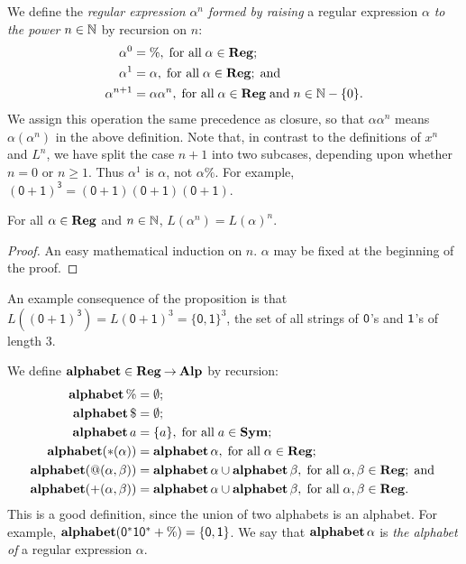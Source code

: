 We define the \emph{regular expression} $\alpha^n$ \emph{formed by
raising} a regular expression $\alpha$ \emph{to the power} $n\in\mathbb{N}$ by
recursion on $n$:
%
\begin{align*}
\alpha^0       &= \%, \;\allowbreak\mbox{for all}\allowbreak\;\alpha\in\mathbf{Reg}; \\
\alpha^1       &= \alpha, \;\allowbreak\mbox{for all}\allowbreak\;\alpha\in\mathbf{Reg}; \;\allowbreak\mbox{and}\allowbreak\; \\
\alpha^{n + 1} &= \alpha\alpha^n,\;\allowbreak\mbox{for all}\allowbreak\;\alpha\in\mathbf{Reg}\;\allowbreak\mbox{and}\allowbreak\;
n\in\mathbb{N}-\{0\} .
\end{align*}
We assign this operation the same precedence as closure, so that
$\alpha\alpha^n$ means $\alpha(\alpha^n)$ in the above definition.
Note that, in contrast to the definitions of $x^n$ and $L^n$,
we have split the case $n+1$ into two subcases, depending upon
whether $n=0$ or $n\geq 1$. Thus
$\alpha^1$ is $\alpha$, not $\alpha\%$.
For example, $\mathsf{(0+1)^3}=\mathsf{(0+1)(0+1)(0+1)}$.

\begin{proposition}
\label{RegExponProp}
For all $\alpha\in\mathbf{Reg}$ and $n\in\mathbb{N}$, $L(\alpha^n)=L(\alpha)^n$.
\end{proposition}

\begin{proof}
An easy mathematical induction on $n$.  $\alpha$ may be fixed at the
beginning of the proof.
\end{proof}

An example consequence of the proposition is that
$L(\mathsf{(0+1)^3})=L(\mathsf{0+1})^3=\{\mathsf{0,1}\}^3$, the
set of all strings of $\mathsf{0}$'s and $\mathsf{1}$'s of length $3$.

We define $\mathbf{alphabet}\in\mathbf{Reg}\mathbin{\to}\mathbf{Alp}$ by recursion:
%
%
\begin{align*}
\mathbf{alphabet}\,\% &= \emptyset; \\
\mathbf{alphabet}\,\$ &= \emptyset; \\
\mathbf{alphabet}\,a &= \{a\}, \;\allowbreak\mbox{for all}\allowbreak\;a\in\mathbf{Sym}; \\
\mathbf{alphabet}({*}(\alpha)) &= \mathbf{alphabet}\,\alpha, \;\allowbreak\mbox{for all}\allowbreak\;\alpha\in\mathbf{Reg};\\
\mathbf{alphabet}(@(\alpha,\beta)) &= \mathbf{alphabet}\,\alpha\cup\mathbf{alphabet}\,\beta ,
\;\allowbreak\mbox{for all}\allowbreak\;\alpha,\beta\in\mathbf{Reg}; \;\allowbreak\mbox{and}\allowbreak\; \\
\mathbf{alphabet}({+}(\alpha,\beta)) &= \mathbf{alphabet}\,\alpha\cup\mathbf{alphabet}\,\beta,
\;\allowbreak\mbox{for all}\allowbreak\;\alpha,\beta\in\mathbf{Reg} .
\end{align*}
This is a good definition, since the union of two alphabets is
an alphabet. For example,
$\mathbf{alphabet}(\mathsf{0^*10^*+\%}) = \mathsf{\{0,1\}}$.
We say that $\mathbf{alphabet}\,\alpha$ is \emph{the alphabet of} a regular
expression $\alpha$.

